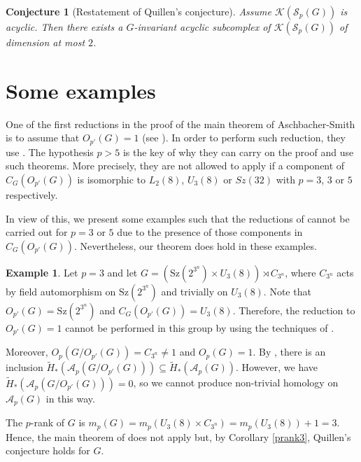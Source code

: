 \documentclass[11pt,twoside,reqno]{amsart}
\theoremstyle{plain}
\newtheorem{conjecture}[theorem]{Conjecture}
\theoremstyle{definition}
\newtheorem{example}[theorem]{Example}
\theoremstyle{remark}
\def\A{\mathcal{A}}
\def\K{\mathcal{K}}
\def\S{\mathcal{S}}
\def\Sz{\mathrm{Sz}}
\begin{document}
\begin{conjecture}[Restatement of Quillen's conjecture]
Assume $\K(\S_p(G))$ is acyclic. Then there exists a $G$-invariant acyclic subcomplex of $\K(\S_p(G))$ of dimension at most $2$.
\end{conjecture}

\section{Some examples}

One of the first reductions in the proof of the main theorem of Aschbacher-Smith \cite{AschbacherSmith} is to assume that $O_{p'}(G) = 1$ (see \cite[Proposition 1.6]{AschbacherSmith}).
In order to perform such reduction, they use \cite[Theorems 2.3 \& 2.4]{AschbacherSmith}.
The hypothesis $p>5$ is the key of why they can carry on the proof and use such theorems.
More precisely, they are not allowed to apply \cite[Theorem 2.3]{AschbacherSmith} if a component of $C_G(O_{p'}(G))$ is isomorphic to $L_2(8)$, $U_3(8)$ or $Sz(32)$ with $p = 3$, $3$ or $5$ respectively.

In view of this, we present some examples such that the reductions of \cite{AschbacherSmith} cannot be carried out for $p =3$ or $5$ due to the presence of those components in $C_G(O_{p'}(G))$. Nevertheless, our theorem does hold in these examples.

\begin{example}\label{example3Prank3}
Let $p = 3$ and let $G = (\Sz(2^{3^n})\times U_3(8))\rtimes C_{3^n}$, where $C_{3^n}$ acts by field automorphism on $\Sz(2^{3^n})$ and trivially on $U_3(8)$.
Note that $O_{p'}(G) = \Sz(2^{3^n})$ and $C_G(O_{p'}(G)) = U_3(8)$.
Therefore, the reduction to $O_{p'}(G) = 1$ cannot be performed in this group by using the techniques of \cite{AschbacherSmith}.

Moreover, $O_p(G/O_{p'}(G)) = C_{3^n}\neq 1$ and $O_p(G) = 1$.
By \cite[Lemma 0.12]{AschbacherSmith}, there is an inclusion $\tilde{H}_*(\A_p(G / O_{p'}(G))) \subseteq \tilde{H}_*(\A_p(G))$.
However, we have $\tilde{H}_*(\A_p(G / O_{p'}(G))) = 0$, so we cannot produce non-trivial homology on $\A_p(G)$ in this way.

The $p$-rank of $G$ is $m_p(G) = m_p(U_3(8)\times C_{3^n}) = m_p(U_3(8)) + 1 = 3$.
Hence, the main theorem of \cite{AschbacherSmith} does not apply but, by Corollary \ref{prank3}, Quillen's conjecture holds for $G$.
\end{example}
\end{document}
